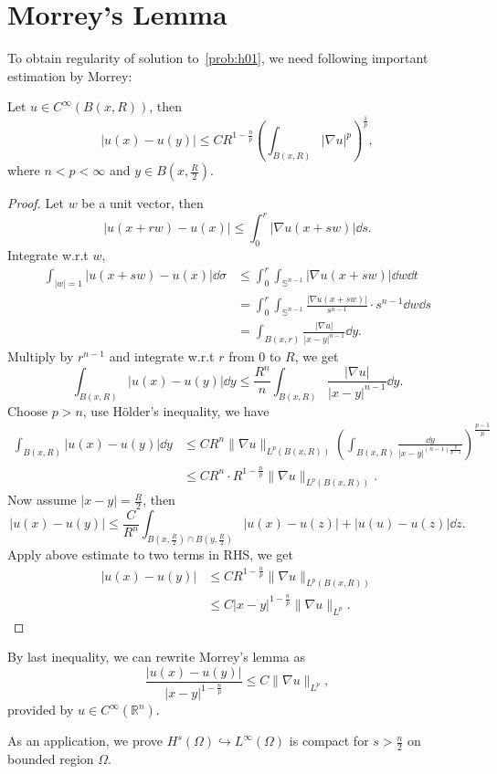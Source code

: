 \documentclass[UTF8,12pt]{article}
\numberwithin{theorem}{section}
\numberwithin{equation}{section}
\begin{document}
\section{Morrey's Lemma}\label{sec:morrey}
To obtain regularity of solution to~\cref{prob:h01}, we need following important
estimation by Morrey:
\begin{lemma}[Morrey]
    Let \(u\in C^\infty(B(x,R))\), then \[
        |u(x)-u(y)|\le CR^{1-\frac{n}{p}}\left(\int_{B(x,R)}|\nabla u|^p
        \right)^{\frac{1}{p}},
    \] where \(n<p<\infty\) and \(y\in B(x,\frac{R}{2})\).
\end{lemma}
\begin{proof}
    Let \(w\) be a unit vector, then \[
        |u(x+rw)-u(x)|\le \int_{0}^{r}|\nabla u(x+sw)|\dd s
    .\] Integrate w.r.t \(w\), 
    \begin{align*}
        \int_{|w|=1}|u(x+sw)-u(x)|\dd{\sigma}
        &\le \int_{0}^{r}\int_{\mathbb{S}^{n-1}}|\nabla u(x+sw)|\dd{w}\dd{t} \\
        &=\int_{0}^{r}\int_{\mathbb{S}^{n-1}}\frac{|\nabla u(x+sw)|}{s^{n-1}}
        \cdot s^{n-1}\dd{w}\dd{s} \\
        &=\int_{B(x,r)}\frac{|\nabla u|}{|x-y|^{n-1}}\dd{y}         
    .\end{align*}
    Multiply by \(r^{n-1}\) and integrate w.r.t \(r\) from 0 to \(R\), we get \[
        \int_{B(x,R)}|u(x)-u(y)|\dd{y}\le \frac{R^n}{n}
        \int_{B(x,R)}\frac{|\nabla u|}{|x-y|^{n-1}}\dd{y}
    .\] Choose \(p>n\), use H\"older's inequality, we have
    \begin{align*}
        \int_{B(x,R)}|u(x)-u(y)|\dd{y}
        &\le CR^n\|\nabla u\|_{L^p(B(x,R))}\left(
        \int_{B(x,R)}\frac{\dd{y}}{|x-y|^{(n-1)\frac{p}{p-1}}}
        \right)^{\frac{p-1}{p}} \\
        &\le CR^n\cdot R^{1-\frac{n}{p}}\|\nabla u\|_{L^p(B(x,R))}
    .\end{align*}
    Now assume \(|x-y|=\frac{R}{2}\), then \[
        |u(x)-u(y)|\le \frac{C}{R^n}\int_{B(x,\frac{R}{2})\cap B(y,\frac{R}{2})}
        |u(x)-u(z)|+|u(u)-u(z)|\dd{z}
    .\] Apply above estimate to two terms in RHS, we get
    \begin{align*}
        |u(x)-u(y)|&\le CR^{1-\frac{n}{p}}\|\nabla u\|_{L^p(B(x,R))} \\
        &\le C|x-y|^{1-\frac{n}{p}}\|\nabla u\|_{L^p}
    .\end{align*}
\end{proof}
\begin{remark}
    By last inequality, we can rewrite Morrey's lemma as \[
        \frac{|u(x)-u(y)|}{|x-y|^{1-\frac{n}{p}}}\le C\|\nabla u\|_{L^p},
    \] provided by \(u\in C^\infty(\mathbb{R}^n)\).
\end{remark}
As an application, we prove \(H^s(\Omega)\hookrightarrow L^\infty(\Omega)\) is
compact for \(s>\frac{n}{2}\) on bounded region \(\Omega\).
\end{document}
